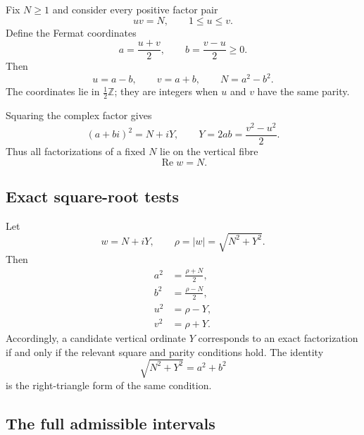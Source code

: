 \documentclass[11pt]{article}
\theoremstyle{definition}
\theoremstyle{remark}
\newcommand{\1}{\mathbf{1}}
\newcommand{\Z}{\mathbb{Z}}
\newcommand{\Repart}{\operatorname{Re}}
\begin{document}
Fix $N\ge1$ and consider every positive factor pair
\begin{equation}
 uv=N,
 \qquad
 1\le u\le v.
 \label{eq:factor-pair}
\end{equation}
Define the Fermat coordinates
\begin{equation}
 a=\frac{u+v}{2},
 \qquad
 b=\frac{v-u}{2}\ge0.
 \label{eq:full-Fermat}
\end{equation}
Then
\begin{equation}
 u=a-b,
 \qquad
 v=a+b,
 \qquad
 N=a^2-b^2.
 \label{eq:full-recovery}
\end{equation}
The coordinates lie in $\frac12\Z$; they are integers when $u$ and $v$ have the same parity.

Squaring the complex factor gives
\begin{equation}
 (a+bi)^2=N+iY,
 \qquad
 \boxed{Y=2ab=\frac{v^2-u^2}{2}.}
 \label{eq:full-square}
\end{equation}
Thus all factorizations of a fixed $N$ lie on the vertical fibre
\begin{equation}
 \Repart w=N.
 \label{eq:vertical-fibre}
\end{equation}

\subsection{Exact square-root tests}

Let
\begin{equation}
 w=N+iY,
 \qquad
 \rho=|w|=\sqrt{N^2+Y^2}.
 \label{eq:rho-full}
\end{equation}
Then
\begin{align}
 a^2&=\frac{\rho+N}{2},
 \label{eq:a-square}\\
 b^2&=\frac{\rho-N}{2},
 \label{eq:b-square}\\
 u^2&=\rho-Y,
 \label{eq:u-square}\\
 v^2&=\rho+Y.
 \label{eq:v-square}
\end{align}
Accordingly, a candidate vertical ordinate $Y$ corresponds to an exact factorization if and only if the relevant square and parity conditions hold.  The identity
\begin{equation}
 \sqrt{N^2+Y^2}=a^2+b^2
 \label{eq:hypotenuse}
\end{equation}
is the right-triangle form of the same condition.

\subsection{The full admissible intervals}
\end{document}
